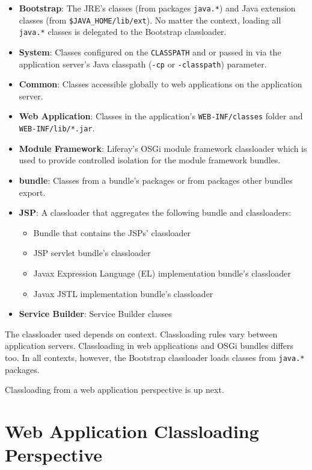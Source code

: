 \begin{itemize}
\item
  \textbf{Bootstrap}: The JRE's classes (from packages \texttt{java.*})
  and Java extension classes (from \texttt{\$JAVA\_HOME/lib/ext}). No
  matter the context, loading all \texttt{java.*} classes is delegated
  to the Bootstrap classloader.
\item
  \textbf{System}: Classes configured on the \texttt{CLASSPATH} and or
  passed in via the application server's Java classpath (\texttt{-cp} or
  \texttt{-classpath}) parameter.
\item
  \textbf{Common}: Classes accessible globally to web applications on
  the application server.
\item
  \textbf{Web Application}: Classes in the application's
  \texttt{WEB-INF/classes} folder and \texttt{WEB-INF/lib/*.jar}.
\item
  \textbf{Module Framework}: Liferay's OSGi module framework classloader
  which is used to provide controlled isolation for the module framework
  bundles.
\item
  \textbf{bundle}: Classes from a bundle's packages or from packages
  other bundles export.
\item
  \textbf{JSP}: A classloader that aggregates the following bundle and
  classloaders:

  \begin{itemize}
  \tightlist
  \item
    Bundle that contains the JSPs' classloader
  \item
    JSP servlet bundle's classloader
  \item
    Javax Expression Language (EL) implementation bundle's classloader
  \item
    Javax JSTL implementation bundle's classloader
  \end{itemize}
\item
  \textbf{Service Builder}: Service Builder classes
\end{itemize}

The classloader used depends on context. Classloading rules vary between
application servers. Classloading in web applications and OSGi bundles
differs too. In all contexts, however, the Bootstrap classloader loads
classes from \texttt{java.*} packages.

Classloading from a web application perspective is up next.

\section{Web Application Classloading
Perspective}\label{web-application-classloading-perspective}

